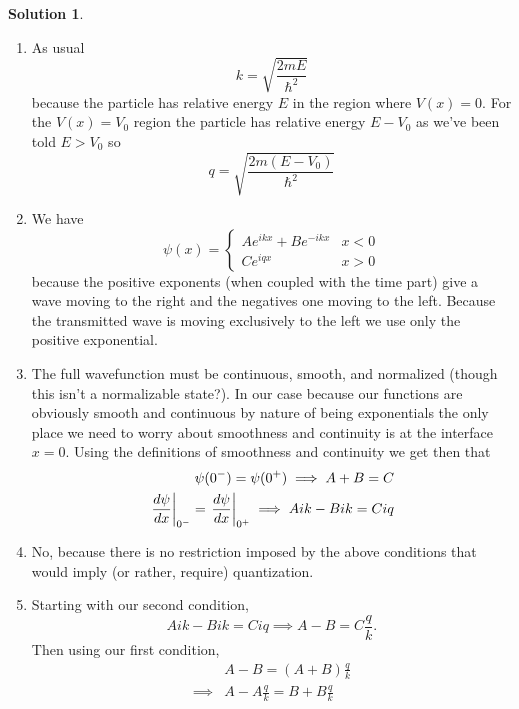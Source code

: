 \documentclass[10pt]{article}
\theoremstyle{definition}
\newtheorem{soln}{Solution}
\begin{document}
\begin{soln}
  \begin{enumerate}[label=(\alph*)]
    \item As usual
          $$k=\sqrt{\frac{2mE}{\hbar^2}}$$
          because the particle has relative energy $E$ in the region where $V(x)=0$.
          For the $V(x)=V_0$ region the particle has relative energy $E-V_0$ as we've
          been told $E>V_0$ so
          $$q=\sqrt{\frac{2m(E-V_0)}{\hbar^2}}$$
    \item We have
          $$\psi(x)=\begin{cases}
              Ae^{ikx}+Be^{-ikx} & x<0 \\
              Ce^{iqx}           & x>0
            \end{cases}
          $$
          because the positive exponents (when coupled with the time part) give a wave moving to the right and the negatives
          one moving to the left. Because the transmitted wave is moving exclusively to the left we use only the positive exponential.
    \item The full wavefunction must be continuous, smooth, and normalized (though this isn't a normalizable state?).
          In our case because our functions are obviously smooth and continuous by nature of being exponentials the only place
          we need to worry about smoothness and continuity is at the interface $x=0$. Using the definitions of smoothness and continuity we get then that
          \begin{align*}
            \psi(0^-)=\psi(0^+)\implies A+B=C                                               \\
            \eval{\frac{d\psi}{dx}}_{0^-}=\eval{\frac{d\psi}{dx}}_{0^+}\implies Aik-Bik=Ciq \\
          \end{align*}
    \item No, because there is no restriction imposed by the above conditions that would imply (or rather, require) quantization.
    \item Starting with our second condition,
          $$Aik-Bik=Ciq\implies A-B=C\frac{q}{k}.$$
          Then using our first condition,
          \begin{align*}
                     & A-B=(A+B)\frac{q}{k}                                                                                                                    \\
            \implies & A-A\frac{q}{k}=B+B\frac{q}{k}                                                                                                           \\

\end{align*}
\end{enumerate}
\end{soln}
\end{document}
